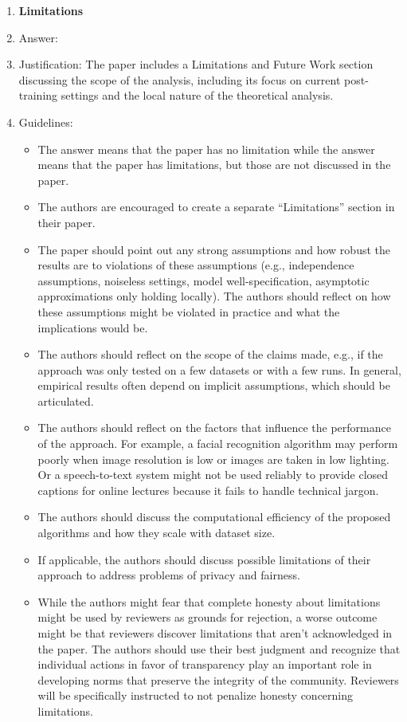 \documentclass{article}
\begin{document}
\begin{enumerate}
\item {\bf Limitations}
    \item[] Answer: \answerYes{}
    \item[] Justification: The paper includes a Limitations and Future Work section discussing the scope of the analysis, including its focus on current post-training settings and the local nature of the theoretical analysis.
    \item[] Guidelines:
    \begin{itemize}
        \item The answer \answerNA{} means that the paper has no limitation while the answer \answerNo{} means that the paper has limitations, but those are not discussed in the paper. 
        \item The authors are encouraged to create a separate ``Limitations'' section in their paper.
        \item The paper should point out any strong assumptions and how robust the results are to violations of these assumptions (e.g., independence assumptions, noiseless settings, model well-specification, asymptotic approximations only holding locally). The authors should reflect on how these assumptions might be violated in practice and what the implications would be.
        \item The authors should reflect on the scope of the claims made, e.g., if the approach was only tested on a few datasets or with a few runs. In general, empirical results often depend on implicit assumptions, which should be articulated.
        \item The authors should reflect on the factors that influence the performance of the approach. For example, a facial recognition algorithm may perform poorly when image resolution is low or images are taken in low lighting. Or a speech-to-text system might not be used reliably to provide closed captions for online lectures because it fails to handle technical jargon.
        \item The authors should discuss the computational efficiency of the proposed algorithms and how they scale with dataset size.
        \item If applicable, the authors should discuss possible limitations of their approach to address problems of privacy and fairness.
        \item While the authors might fear that complete honesty about limitations might be used by reviewers as grounds for rejection, a worse outcome might be that reviewers discover limitations that aren't acknowledged in the paper. The authors should use their best judgment and recognize that individual actions in favor of transparency play an important role in developing norms that preserve the integrity of the community. Reviewers will be specifically instructed to not penalize honesty concerning limitations.
    \end{itemize}


\end{enumerate}
\end{document}
